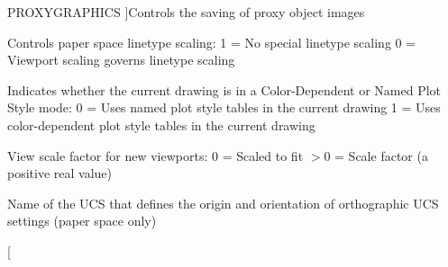 \begin{Desc}
\begin{description}
{P\+R\+O\+X\+Y\+G\+R\+A\+P\+H\+I\+CS\hypertarget{class_c_a_d_header_abd894aab7aa85b4c4634e67fb93d6886ae877ef963bc68f5d41f734066cbcd4b4}{}\label{class_c_a_d_header_abd894aab7aa85b4c4634e67fb93d6886ae877ef963bc68f5d41f734066cbcd4b4}
}]Controls the saving of proxy object images \item[{\em 
P\+S\+L\+T\+S\+C\+A\+LE\hypertarget{class_c_a_d_header_abd894aab7aa85b4c4634e67fb93d6886a5d1d63da87d30431c36bf968f381613c}{}\label{class_c_a_d_header_abd894aab7aa85b4c4634e67fb93d6886a5d1d63da87d30431c36bf968f381613c}
}]Controls paper space linetype scaling\+: 1 = No special linetype scaling 0 = Viewport scaling governs linetype scaling \item[{\em 
P\+S\+T\+Y\+L\+E\+M\+O\+DE\hypertarget{class_c_a_d_header_abd894aab7aa85b4c4634e67fb93d6886a69c6e9ec01d115782c287592e79c525f}{}\label{class_c_a_d_header_abd894aab7aa85b4c4634e67fb93d6886a69c6e9ec01d115782c287592e79c525f}
}]Indicates whether the current drawing is in a Color-\/\+Dependent or Named Plot Style mode\+: 0 = Uses named plot style tables in the current drawing 1 = Uses color-\/dependent plot style tables in the current drawing \item[{\em 
P\+S\+V\+P\+S\+C\+A\+LE\hypertarget{class_c_a_d_header_abd894aab7aa85b4c4634e67fb93d6886a71c3465a156fa31e31211dce87be2415}{}\label{class_c_a_d_header_abd894aab7aa85b4c4634e67fb93d6886a71c3465a156fa31e31211dce87be2415}
}]View scale factor for new viewports\+: 0 = Scaled to fit $>$0 = Scale factor (a positive real value) \item[{\em 
P\+U\+C\+S\+B\+A\+SE\hypertarget{class_c_a_d_header_abd894aab7aa85b4c4634e67fb93d6886a106c6316a7f145d03eff37817beb141a}{}\label{class_c_a_d_header_abd894aab7aa85b4c4634e67fb93d6886a106c6316a7f145d03eff37817beb141a}
}]Name of the U\+CS that defines the origin and orientation of orthographic U\+CS settings (paper space only) \item[{\em 
}
\end{description}
\end{Desc}
